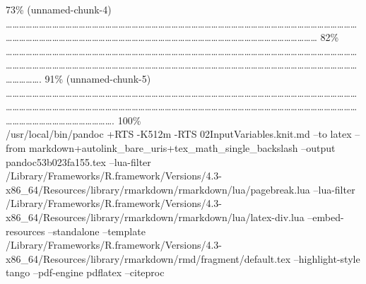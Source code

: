 \documentclass[
]{article}
\begin{document}
\textbar{} 73\% (unnamed-chunk-4) \textbar{}
\textbar\ldots\ldots\ldots\ldots\ldots\ldots\ldots\ldots\ldots\ldots\ldots\ldots\ldots\ldots\ldots\ldots\ldots\ldots\ldots\ldots\ldots\ldots\ldots\ldots\ldots\ldots\ldots\ldots\ldots\ldots\ldots\ldots\ldots\ldots\ldots\ldots\ldots\ldots\ldots\ldots\ldots\ldots\ldots\ldots\ldots\ldots\ldots\ldots\ldots\ldots\ldots\ldots\ldots\ldots\ldots\ldots\ldots\ldots\ldots\ldots\ldots\ldots\ldots\ldots\ldots\ldots\ldots\ldots\ldots\ldots\ldots\ldots\ldots\ldots\ldots\ldots\ldots\ldots\ldots\ldots\ldots\ldots\ldots\ldots\ldots\ldots\ldots\ldots\ldots\ldots\ldots\ldots\ldots\ldots\ldots\ldots\ldots\ldots\ldots\ldots{}
\textbar{} 82\% \textbar{}
\textbar\ldots\ldots\ldots\ldots\ldots\ldots\ldots\ldots\ldots\ldots\ldots\ldots\ldots\ldots\ldots\ldots\ldots\ldots\ldots\ldots\ldots\ldots\ldots\ldots\ldots\ldots\ldots\ldots\ldots\ldots\ldots\ldots\ldots\ldots\ldots\ldots\ldots\ldots\ldots\ldots\ldots\ldots\ldots\ldots\ldots\ldots\ldots\ldots\ldots\ldots\ldots\ldots\ldots\ldots\ldots\ldots\ldots\ldots\ldots\ldots\ldots\ldots\ldots\ldots\ldots\ldots\ldots\ldots\ldots\ldots\ldots\ldots\ldots\ldots\ldots\ldots\ldots\ldots\ldots\ldots\ldots\ldots\ldots\ldots\ldots\ldots\ldots\ldots\ldots\ldots\ldots\ldots\ldots\ldots\ldots\ldots\ldots\ldots\ldots\ldots\ldots\ldots\ldots\ldots\ldots\ldots\ldots\ldots\ldots\ldots\ldots.
\textbar{} 91\% (unnamed-chunk-5) \textbar{}
\textbar\ldots\ldots\ldots\ldots\ldots\ldots\ldots\ldots\ldots\ldots\ldots\ldots\ldots\ldots\ldots\ldots\ldots\ldots\ldots\ldots\ldots\ldots\ldots\ldots\ldots\ldots\ldots\ldots\ldots\ldots\ldots\ldots\ldots\ldots\ldots\ldots\ldots\ldots\ldots\ldots\ldots\ldots\ldots\ldots\ldots\ldots\ldots\ldots\ldots\ldots\ldots\ldots\ldots\ldots\ldots\ldots\ldots\ldots\ldots\ldots\ldots\ldots\ldots\ldots\ldots\ldots\ldots\ldots\ldots\ldots\ldots\ldots\ldots\ldots\ldots\ldots\ldots\ldots\ldots\ldots\ldots\ldots\ldots\ldots\ldots\ldots\ldots\ldots\ldots\ldots\ldots\ldots\ldots\ldots\ldots\ldots\ldots\ldots\ldots\ldots\ldots\ldots\ldots\ldots\ldots\ldots\ldots\ldots\ldots\ldots\ldots\ldots\ldots\ldots\ldots\ldots\ldots\ldots\ldots\ldots\ldots\ldots.\textbar{}
100\%\\
/usr/local/bin/pandoc +RTS -K512m -RTS 02InputVariables.knit.md --to
latex --from markdown+autolink\_bare\_uris+tex\_math\_single\_backslash
--output pandoc53b023fa155.tex --lua-filter
/Library/Frameworks/R.framework/Versions/4.3-x86\_64/Resources/library/rmarkdown/rmarkdown/lua/pagebreak.lua
--lua-filter
/Library/Frameworks/R.framework/Versions/4.3-x86\_64/Resources/library/rmarkdown/rmarkdown/lua/latex-div.lua
--embed-resources --standalone --template
/Library/Frameworks/R.framework/Versions/4.3-x86\_64/Resources/library/rmarkdown/rmd/fragment/default.tex
--highlight-style tango --pdf-engine pdflatex --citeproc
\end{document}
